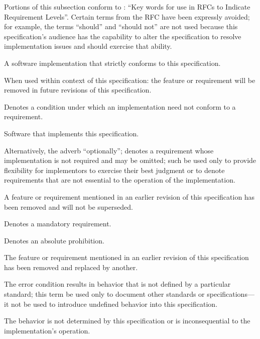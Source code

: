 %

Portions of this subsection conform to : ``Key words for use in RFCs
to Indicate Requirement Levels''. Certain terms from the RFC have been expressly
avoided; for example, the terms ``should'' and ``should not'' are not used
because this specification's audience has the capability to alter the
specification to resolve implementation issues and should exercise that ability.

\begin{description}
  A software implementation that strictly conforms to this specification.

  When used within context of this specification: the feature or requirement
  will be removed in future revisions of this specification.

  Denotes a condition under which an implementation need not conform to a
  requirement.

  Software that implements this specification.

  Alternatively, the adverb ``optionally''; denotes a requirement whose
  implementation is not required and may be omitted; such \shall be used only to
  provide flexibility for implementors to exercise their best judgment or to
  denote requirements that are not essential to the operation of the
  implementation.

  A feature or requirement mentioned in an earlier revision of this
  specification has been removed and will not be superseded.

  Denotes a mandatory requirement.

  Denotes an absolute prohibition.

  The feature or requirement mentioned in an earlier revision of this
  specification has been removed and replaced by another.

  The error condition results in behavior that is not defined by a particular
  standard; this term \shall be used only to document other standards or
  specifications---it \shall not be used to introduce undefined behavior into
  this specification.

  The behavior is not determined by this specification or is inconsequential to
  the implementation's operation.
\end{description}
